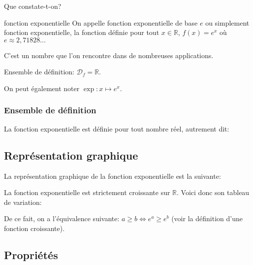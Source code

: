 \documentclass[a4paper,12pt]{scrartcl}
\begin{document}
Que constate-t-on?


\begin{definition}{fonction exponentielle}
 On appelle \og{}fonction exponentielle de base $e$\fg{} ou simplement \og{}fonction exponentielle\fg{}, la fonction définie pour tout $x \in \mathbb{R}$, $f(x) =  e^x$ où $e \approx 2,71828\ldots$ 
\end{definition}

C'est un nombre que l'on rencontre dans de nombreuses applications.

Ensemble de définition: $\mathcal{D}_f = \mathbb{R}$.

On peut également noter $\exp : x \longmapsto e^x$.

\subsubsection{Ensemble de définition}

La fonction exponentielle est définie pour tout nombre réel, autrement dit: 


\subsection{Représentation graphique} 

La représentation graphique de la fonction exponentielle est la suivante:

\begin{center}
\end{center}

La fonction exponentielle est strictement croissante sur $\mathbb{R}$. Voici donc son tableau de variation:

\begin{center} 
\end{center}

De ce fait, on a l'équivalence suivante: $a \geqslant b \Leftrightarrow e^a \geqslant e^b$ (voir la définition d'une fonction croissante).

\subsection{Propriétés}
\end{document}
